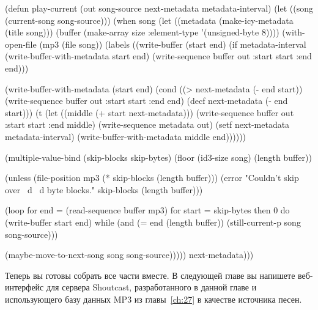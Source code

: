 \begin{myverb}
(defun play-current (out song-source next-metadata metadata-interval)
  (let ((song (current-song song-source)))
    (when song
      (let ((metadata (make-icy-metadata (title song)))
            (buffer (make-array size :element-type '(unsigned-byte 8))))
        (with-open-file (mp3 (file song))
          (labels ((write-buffer (start end)
                     (if metadata-interval
                       (write-buffer-with-metadata start end)
                       (write-sequence buffer out :start start :end end)))

                   (write-buffer-with-metadata (start end)
                     (cond
                       ((> next-metadata (- end start))
                        (write-sequence buffer out :start start :end end)
                        (decf next-metadata (- end start)))
                       (t 
                        (let ((middle (+ start next-metadata)))
                          (write-sequence buffer out :start start :end middle)
                          (write-sequence metadata out)
                          (setf next-metadata metadata-interval)
                          (write-buffer-with-metadata middle end))))))

            (multiple-value-bind (skip-blocks skip-bytes)
                (floor (id3-size song) (length buffer))

              (unless (file-position mp3 (* skip-blocks (length buffer)))
                (error "Couldn't skip over ~d ~d byte blocks."
                       skip-blocks (length buffer)))

              (loop for end = (read-sequence buffer mp3) 
                 for start = skip-bytes then 0
                 do (write-buffer start end)
                 while (and (= end (length buffer))
                            (still-current-p song song-source)))

              (maybe-move-to-next-song song song-source)))))
      next-metadata)))
\end{myverb}

Теперь вы готовы собрать все части вместе.  В следующей главе вы напишете веб-интерфейс
для сервера Shoutcast, разработанного в данной главе и использующего базу данных MP3 из
главы~\ref{ch:27} в качестве источника песен.

